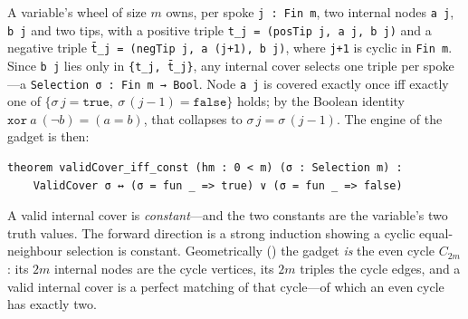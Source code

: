 \documentclass[a4paper,UKenglish,cleveref,autoref]{lipics-v2021}
\begin{document}
A variable's wheel of size $m$ owns, per spoke \lstinline{j : Fin m}, two internal nodes \lstinline{a j}, \lstinline{b j}
and two tips, with a positive triple \lstinline{t_j = (posTip j, a j, b j)} and a negative triple
\lstinline{t̄_j = (negTip j, a (j+1), b j)}, where \lstinline{j+1} is cyclic in \lstinline{Fin m}. Since
\lstinline{b j} lies only in \lstinline|{t_j, t̄_j}|, any internal cover selects one triple per spoke---a
\lstinline{Selection σ : Fin m → Bool}. Node \lstinline{a j} is covered exactly once iff exactly one of
$\{\sigma\,j = \mathtt{true},\ \sigma\,(j{-}1) = \mathtt{false}\}$ holds; by the Boolean identity
$\mathtt{xor}\ a\ (\lnot b) = (a = b)$, that collapses to $\sigma\,j = \sigma\,(j{-}1)$. The engine of the
gadget is then:
\begin{lstlisting}
theorem validCover_iff_const (hm : 0 < m) (σ : Selection m) :
    ValidCover σ ↔ (σ = fun _ => true) ∨ (σ = fun _ => false)
\end{lstlisting}
A valid internal cover is \emph{constant}---and the two constants are the variable's two truth values. The
forward direction is a strong induction showing a cyclic equal-neighbour selection is constant. Geometrically
() the gadget \emph{is} the even cycle $C_{2m}$: its $2m$ internal nodes are the cycle
vertices, its $2m$ triples the cycle edges, and a valid internal cover is a perfect matching of that
cycle---of which an even cycle has exactly two.
\end{document}
